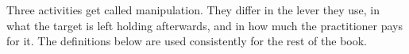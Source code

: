 
\begin{chapterblurb}
Three activities get called manipulation. They differ in the lever they use, in what the target is left holding afterwards, and in how much the practitioner pays for it. The definitions below are used consistently for the rest of the book.
\end{chapterblurb}
